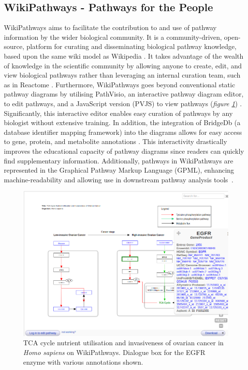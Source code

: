 \documentclass[a4paper,12pt,twoside]{apa}
\begin{document}
\subsection{WikiPathways - Pathways for the People}

WikiPathways aims to facilitate the contribution to and use of pathway information by the wider biological community. It is a community-driven, open-source, platform for curating and disseminating biological pathway knowledge, based upon the same wiki model as Wikipedia \cite{pico2008wikipathways}. It takes advantage of the wealth of knowledge in the scientific community by allowing anyone to create, edit, and view biological pathways rather than leveraging an internal curation team, such as in Reactome \cite{joshi2005reactome}. Furthermore, WikiPathways goes beyond conventional static pathway diagrams by utilising PathVisio, an interactive pathway diagram editor, to edit pathways, and a JavaScript version (PVJS) to view pathways (\textit{figure \ref{pathway:homo-sapiens-ovarian-cancer}}) \cite{kutmon2015pathvisio}. Significantly, this interactive editor enables easy curation of pathways by any biologist without extensive training. In addition, the integration of BridgeDb (a database identifier mapping framework) into the diagrams allows for easy access to gene, protein, and metabolite annotations \cite{van2010bridgedb, kelder2012wikipathways}. This interactivity drastically improves the educational capacity of pathway diagrams since readers can quickly find supplementary information. Additionally, pathways in WikiPathways are represented in the Graphical Pathway Markup Language (GPML), enhancing machine-readability and allowing use in downstream pathway analysis tools~\cite{kelder2012wikipathways}.

\begin{figure}[h]
  \centering
  \includegraphics[scale=0.5]{figures/homo-sapiens-ovarian-cancer.png}
  \caption{TCA cycle nutrient utilisation and invasiveness of ovarian cancer in \textit{Homo sapiens} on WikiPathways. Dialogue box for the EGFR enzyme with various annotations shown.}
  \label{pathway:homo-sapiens-ovarian-cancer}
\end{figure}
\end{document}
